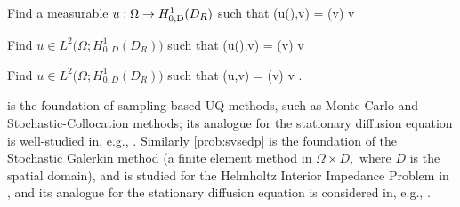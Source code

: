 \label{prob:msedp}
Find a measurable $u:\Omega\rightarrow\HozDDR$ such that
\vspace{-2ex}
\beqs
{}\mleft(u(\omega),v\mright) = (v) \tforall v \in \HozDDR {}
\eeqs
\eprob

\label{prob:somsedp}
Find $u\in L^2\big(\Omega;H_{0,D}^1(D_R)\big)$ such that
\beqs
{}\mleft(u(\omega),v\mright) = (v) \tforall v \in \HozDDR {}
\eeqs
\eprob

\label{prob:svsedp}
Find $u\in L^2\big(\Omega;H_{0,D}^1(D_R)\big)$ such that
\beqs
\as(u,v) = \Ls(v) \tforall v \in \LtOHozDDR.
\eeqs
\eprob


 is the foundation of sampling-based UQ methods, such as Monte-Carlo and Stochastic-Collocation methods; its analogue for the stationary diffusion equation is well-studied in, e.g., \cite{XiHe:05,BaNoTe:07,NoTeWe:08a,Ch:12,ChScTe:13,TeJaWeGu:15,KuNu:16,HeLaSc:18}. Similarly \cref{prob:svsedp} is the foundation of the Stochastic Galerkin method (a finite element method in $\Omega \times D,$ where $D$ is the spatial domain), and is studied for the Helmholtz Interior Impedance Problem in \cite{FeLiLo:15}, and its analogue for the stationary diffusion equation is considered in, e.g., \cite{BaTeZo:04,KhSc:11,BaScZo:11,GuWeZh:14}.

